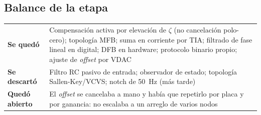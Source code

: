 
\subsection{Balance de la etapa}

\begin{center}\small
\begin{tabularx}{\textwidth}{@{}l X@{}}
\toprule
\textbf{Se qued\'o} & Compensaci\'on activa por elevaci\'on de $\zeta$ (no cancelaci\'on polo-cero); topolog\'ia MFB; suma en corriente por TIA; filtrado de fase lineal en digital; DFB en hardware; protocolo binario propio; ajuste de \emph{offset} por VDAC \\
\addlinespace[3pt]
\textbf{Se descart\'o} & Filtro RC pasivo de entrada; observador de estado; topolog\'ia Sallen-Key/VCVS; notch de \SI{50}{\hertz} (m\'as tarde) \\
\addlinespace[3pt]
\textbf{Qued\'o abierto} & El \emph{offset} se cancelaba a mano y hab\'ia que repetirlo por placa y por ganancia: no escalaba a un arreglo de varios nodos \\
\bottomrule
\end{tabularx}
\end{center}
